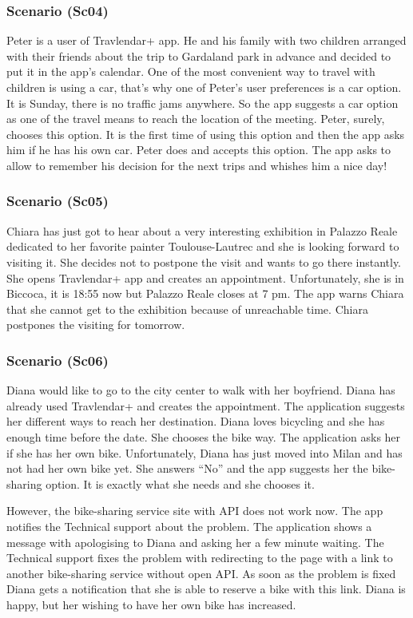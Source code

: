 \documentclass[a4paper,leqno]{book}
\begin{document}
\subsubsection{Scenario (Sc04)}
Peter is a user of Travlendar+ app. He and his family with two children arranged with their friends about the trip to Gardaland park in advance and decided to put it in the app’s calendar. One of the most convenient way to travel with children is using a car, that’s why one of Peter’s user preferences is a car option. It is Sunday, there is no traffic jams anywhere. So the app suggests a car option as one of the travel means to reach the location of the meeting. Peter, surely, chooses this option. It is the first time of using this option and then the app asks him if he has his own car. Peter does and accepts this option. The app asks to allow to remember his decision for the next trips and whishes him a nice day!

\subsubsection{Scenario (Sc05)}
Chiara has just got to hear about a very interesting exhibition in Palazzo Reale dedicated to her favorite painter Toulouse-Lautrec and she is looking forward to visiting it. She decides not to postpone the visit and wants to go there instantly. She opens Travlendar+ app and creates an appointment. Unfortunately, she is in Biccoca, it is 18:55 now but Palazzo Reale closes at 7 pm.   The app warns Chiara that she cannot get to the exhibition because of unreachable time. Chiara postpones the visiting for tomorrow.

\subsubsection{Scenario (Sc06)}
Diana would like to go to the city center to walk with her boyfriend. Diana has already used Travlendar+ and creates the appointment. The application suggests her different ways to reach her destination. Diana loves bicycling and she has enough time before the date. She chooses the bike way. The application asks her if she has her own bike. Unfortunately, Diana has just moved into Milan and has not had her own bike yet. She answers “No” and the app suggests her the bike-sharing option. It is exactly what she needs and she chooses it. 

However, the bike-sharing service site with API does not work now. The app notifies the Technical support about the problem. The application shows a message with apologising to Diana and asking her a few minute waiting. The Technical support fixes the problem with redirecting to the page with a link to another bike-sharing service without open API.  As soon as the problem is fixed Diana gets a notification that she is able to reserve a bike with this link. Diana is happy, but her wishing to have her own bike has increased.
\end{document}

